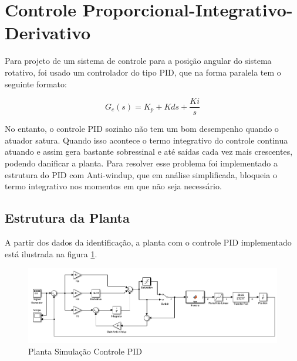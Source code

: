 \documentclass[a4paper,11pt]{article}
\begin{document}

\section{Controle Proporcional-Integrativo-Derivativo}


Para projeto de um sistema de controle para a posição angular do sistema rotativo, foi usado um controlador do tipo PID, que na forma paralela tem o seguinte formato:

\begin{equation}
    G_c(s) = K_p + Kd s + \frac{Ki}{s}
\end{equation}

No entanto, o controle PID sozinho não tem um bom desempenho quando o atuador satura. Quando isso acontece o termo integrativo do controle continua atuando e assim gera bastante sobressinal e até saídas cada vez mais crescentes, podendo danificar a planta. Para resolver esse problema foi implementado a estrutura do PID com Anti-windup, que em análise simplificada, bloqueia o termo integrativo nos momentos em que não seja necessário.


\subsection{Estrutura da Planta}

A partir dos dados da identificação, a planta com o controle PID implementado está ilustrada na figura \ref{fig:planta_PID}.

\begin{figure}[H]
    \centering
    \includegraphics[width=1.0\linewidth]{tex/img/Planta_PID.png}
    \caption{Planta Simulação Controle PID}
    \label{fig:planta_PID}
\end{figure}
\end{document}
